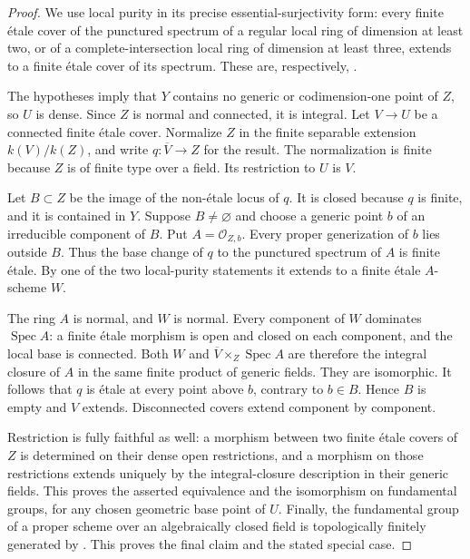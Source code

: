 \begin{proof}
We use local purity in its precise essential-surjectivity form:
every finite \'etale cover of the punctured spectrum of a regular
local ring of dimension at least two, or of a complete-intersection
local ring of dimension at least three, extends to a finite \'etale
cover of its spectrum. These are, respectively,
\cite[Lemma 58.21.3(1), tag 0BMA; Proposition 58.25.3, tag 0BPD]{StacksDLocalPurity}.

The hypotheses imply that $Y$ contains no generic or codimension-one
point of $Z$, so $U$ is dense. Since $Z$ is normal and connected,
it is integral. Let $V\to U$ be a connected finite \'etale cover.
Normalize $Z$ in the finite separable extension $k(V)/k(Z)$, and
write $q:\overline V\to Z$ for the result. The normalization is
finite because $Z$ is of finite type over a field. Its restriction
to $U$ is $V$.

Let $B\subset Z$ be the image of the non-\'etale locus of $q$.
It is closed because $q$ is finite, and it is contained in $Y$.
Suppose $B\ne\varnothing$ and choose a generic point $b$ of an
irreducible component of $B$. Put $A=\mathcal O_{Z,b}$.
Every proper generization of $b$ lies outside $B$. Thus the base
change of $q$ to the punctured spectrum of $A$ is finite \'etale.
By one of the two local-purity statements it extends to a finite
\'etale $A$-scheme $W$.

The ring $A$ is normal, and $W$ is normal. Every component of $W$
dominates $\operatorname{Spec}A$: a finite \'etale morphism is open
and closed on each component, and the local base is connected.
Both $W$ and $\overline V\times_Z\operatorname{Spec}A$ are therefore
the integral closure of $A$ in the same finite product of generic
fields. They are isomorphic. It follows that $q$ is \'etale at
every point above $b$, contrary to $b\in B$. Hence $B$ is empty
and $V$ extends. Disconnected covers extend component by component.

Restriction is fully faithful as well: a morphism between two
finite \'etale covers of $Z$ is determined on their dense open
restrictions, and a morphism on those restrictions extends uniquely
by the integral-closure description in their generic fields.
This proves the asserted equivalence and the isomorphism on
fundamental groups, for any chosen geometric base point of $U$.
Finally, the fundamental group of a proper scheme over an
algebraically closed field is topologically finitely generated by
\cite[X, Theorem 2.9, pp.~273--274]{SGA1}. This proves the final
claim and the stated special case.
\end{proof}
